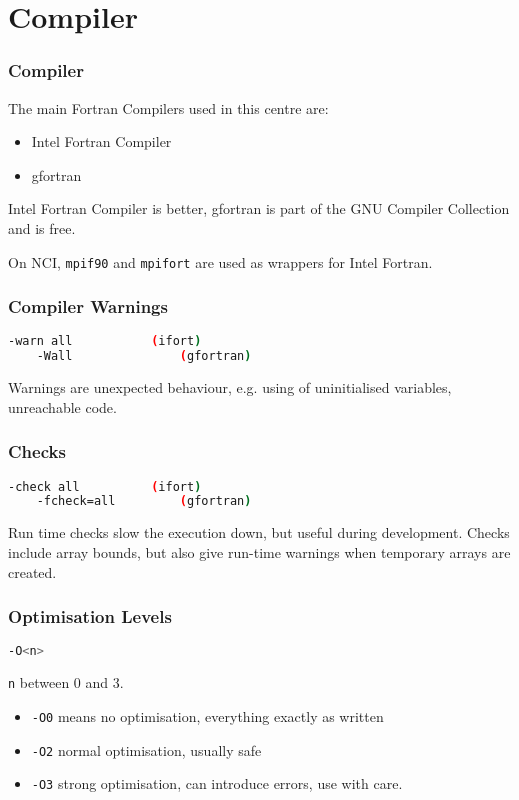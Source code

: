\section{Compiler}
\begin{frame}
    \frametitle{Compiler}
    The main Fortran Compilers used in this centre are:
    \begin{itemize}
        \item Intel Fortran Compiler
        \item gfortran
    \end{itemize}
    Intel Fortran Compiler is better, gfortran is part of the GNU Compiler Collection and is free.

    On NCI, \texttt{mpif90} and \texttt{mpifort} are used as wrappers for Intel Fortran. 
\end{frame}
\begin{frame}[fragile]
    \frametitle{Compiler Warnings}
    \begin{lstlisting}[language=bash]
    -warn all           (ifort)
    -Wall               (gfortran)
    \end{lstlisting}
    Warnings are unexpected behaviour, e.g. using of uninitialised variables, unreachable code.
\end{frame}
\begin{frame}[fragile]
    \frametitle{Checks}
    \begin{lstlisting}[language=bash]
    -check all          (ifort)    
    -fcheck=all         (gfortran)
    \end{lstlisting}
    Run time checks slow the execution down, but useful during development.
    Checks include array bounds, but also give run-time warnings when temporary arrays are created.
\end{frame}
\begin{frame}[fragile]
    \frametitle{Optimisation Levels}
    \begin{lstlisting}[language=bash]
    -O<n>
    \end{lstlisting}
    \texttt{n} between 0 and 3.
    \begin{itemize}
    \item \texttt{-O0} means no optimisation, everything exactly as written
    \item \texttt{-O2} normal optimisation, usually safe
    \item \texttt{-O3} strong optimisation, can introduce errors, use with care.
    \end{itemize}
\end{frame}
